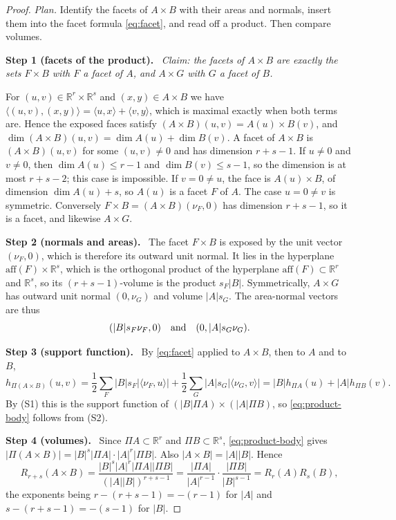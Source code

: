 \documentclass[11pt]{article}
\newcommand{\R}{\mathbb R}
\newcommand{\step}[1]{\par\smallskip\noindent\textbf{#1}\ }
\begin{document}
\begin{proof}
\emph{Plan.} Identify the facets of \(A\times B\) with their areas and
normals, insert them into the facet formula \eqref{eq:facet}, and read
off a product. Then compare volumes.

\step{Step 1 (facets of the product).} \emph{Claim: the facets of
\(A\times B\) are exactly the sets \(F\times B\) with \(F\) a facet of
\(A\), and \(A\times G\) with \(G\) a facet of \(B\).}

For \((u,v)\in\R^r\times\R^s\) and \((x,y)\in A\times B\) we have
\(\langle(u,v),(x,y)\rangle=\langle u,x\rangle+\langle v,y\rangle\),
which is maximal exactly when both terms are. Hence the exposed faces
satisfy \((A\times B)(u,v)=A(u)\times B(v)\), and
\(\dim(A\times B)(u,v)=\dim A(u)+\dim B(v)\). A facet of \(A\times B\)
is \((A\times B)(u,v)\) for some \((u,v)\ne0\) and has dimension
\(r+s-1\). If \(u\ne0\) and \(v\ne0\), then \(\dim A(u)\le r-1\) and
\(\dim B(v)\le s-1\), so the dimension is at most \(r+s-2\); this case
is impossible. If \(v=0\ne u\), the face is \(A(u)\times B\), of
dimension \(\dim A(u)+s\), so \(A(u)\) is a facet \(F\) of \(A\). The
case \(u=0\ne v\) is symmetric. Conversely
\(F\times B=(A\times B)(\nu_F,0)\) has dimension \(r+s-1\), so it is a
facet, and likewise \(A\times G\).

\step{Step 2 (normals and areas).} The facet \(F\times B\) is exposed
by the unit vector \((\nu_F,0)\), which is therefore its outward unit
normal. It lies in the hyperplane
\(\mathrm{aff}(F)\times\R^s\), which is the orthogonal product of the
hyperplane \(\mathrm{aff}(F)\subset\R^r\) and \(\R^s\), so its
\((r+s-1)\)-volume is the product \(s_F|B|\). Symmetrically,
\(A\times G\) has outward unit normal \((0,\nu_G)\) and volume
\(|A|s_G\). The area-normal vectors are thus
\[
 (|B|s_F\nu_F,0)
 \quad\hbox{and}\quad
 (0,|A|s_G\nu_G).
\]

\step{Step 3 (support function).} By \eqref{eq:facet} applied to
\(A\times B\), then to \(A\) and to \(B\),
\[
 h_{\Pi(A\times B)}(u,v)
 =\frac12\sum_F|B|s_F|\langle\nu_F,u\rangle|
  +\frac12\sum_G|A|s_G|\langle\nu_G,v\rangle|
 =|B|h_{\Pi A}(u)+|A|h_{\Pi B}(v).
\]
By (S1) this is the support function of
\((|B|\Pi A)\times(|A|\Pi B)\), so \eqref{eq:product-body} follows from
(S2).

\step{Step 4 (volumes).} Since \(\Pi A\subset\R^r\) and
\(\Pi B\subset\R^s\), \eqref{eq:product-body} gives
\(|\Pi(A\times B)|=|B|^s|\Pi A|\cdot|A|^r|\Pi B|\). Also
\(|A\times B|=|A||B|\). Hence
\[
 R_{r+s}(A\times B)
 =\frac{|B|^s|A|^r|\Pi A||\Pi B|}
         {(|A||B|)^{r+s-1}}
 =\frac{|\Pi A|}{|A|^{r-1}}
   \cdot\frac{|\Pi B|}{|B|^{s-1}}
 =R_r(A)R_s(B),
\]
the exponents being \(r-(r+s-1)=-(r-1)\) for \(|A|\) and
\(s-(r+s-1)=-(s-1)\) for \(|B|\).
\end{proof}
\end{document}
